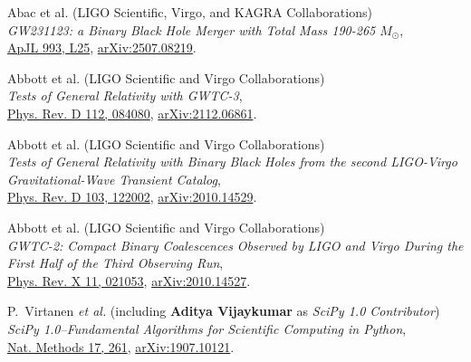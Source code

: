 \begin{etaremune}
	\item Abac et al. (LIGO Scientific, Virgo, and KAGRA Collaborations)\\
	\textit{GW231123: a Binary Black Hole Merger with Total Mass 190-265 $M_\odot$},\\
	\href{https://doi.org/10.3847/2041-8213/ae0c9c}{ApJL 993, L25}, \href{https://arxiv.org/abs/2507.08219}{arXiv:2507.08219}.

	\item Abbott et al. (LIGO Scientific and Virgo Collaborations)\\
	\textit{Tests of General Relativity with GWTC-3},\\
	\href{https://doi.org/10.1103/PhysRevD.112.084080}{Phys. Rev. D 112, 084080}, \href{https://arxiv.org/abs/2112.06861}{arXiv:2112.06861}.

	\item Abbott et al. (LIGO Scientific and Virgo Collaborations)\\
	\textit{Tests of General Relativity with Binary Black Holes from the second LIGO-Virgo Gravitational-Wave Transient Catalog},\\
	\href{https://doi.org/10.1103/PhysRevD.103.122002}{Phys. Rev. D 103, 122002}, \href{https://arxiv.org/abs/2010.14529}{arXiv:2010.14529}.

	\item Abbott et al. (LIGO Scientific and Virgo Collaborations)\\
	\textit{GWTC-2: Compact Binary Coalescences Observed by LIGO and Virgo During the First Half of the Third Observing Run},\\
	\href{https://doi.org/10.1103/PhysRevX.11.021053}{Phys. Rev. X 11, 021053}, \href{https://arxiv.org/abs/2010.14527}{arXiv:2010.14527}.

	\item 	P.~Virtanen {\it et al.} (including \textbf{Aditya Vijaykumar} as \textit{SciPy 1.0 Contributor})\\
	\textit{SciPy 1.0--Fundamental Algorithms for Scientific Computing in Python},\\
	\href{https://doi.org/10.1038/s41592-019-0686-2}{Nat. Methods 17, 261},
	\href{https://arxiv.org/abs/1907.10121}{arXiv:1907.10121}.
	
\end{etaremune}
